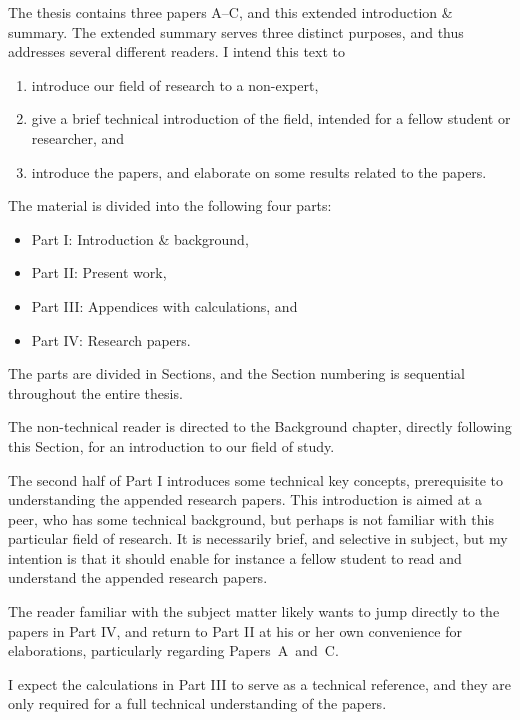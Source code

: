 \documentclass[thesis.tex]{subfiles}
\begin{document}
The thesis contains three papers A--C, and this extended introduction \& summary. The extended summary serves three distinct purposes, and thus addresses several different readers. I intend this text to 
\begin{enumerate}
	\item introduce our field of research to a non-expert,
	\item give a brief technical introduction of the field, intended for a fellow student or researcher, and
	\item introduce the papers, and elaborate on some results related to the papers.
\end{enumerate}
The material is divided into the following four parts:
\begin{itemize}
	\item Part I: Introduction \& background,
	\item Part II: Present work,
	\item Part III: Appendices with calculations, and
	\item Part IV: Research papers.
\end{itemize}
The parts are divided in Sections, and the Section numbering is sequential throughout the entire thesis.

The non-technical reader is directed to the Background chapter, directly following this Section, for an introduction to our field of study. 

The second half of Part I introduces some technical key concepts, prerequisite to understanding the appended research papers. This introduction is aimed at a peer, who has some technical background, but perhaps is not familiar with this particular field of research. It is necessarily brief, and selective in subject, but my intention is that it should enable for instance a fellow student to read and understand the appended research papers.

The reader familiar with the subject matter likely wants to jump directly to the papers in Part IV, and return to Part II at his or her own convenience for elaborations, particularly regarding Papers~A~and~C.

I expect the calculations in Part III to serve as a technical reference, and they are only required for a full technical understanding of the papers.
\end{document}
